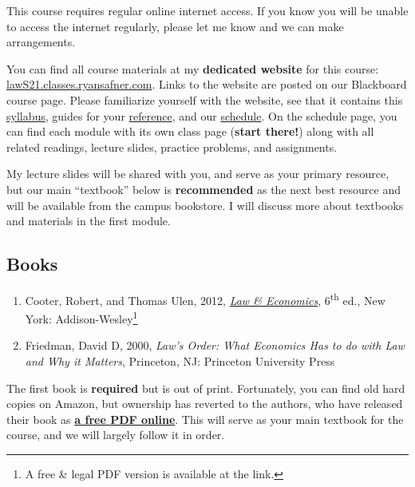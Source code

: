 \documentclass{article}
\begin{document}
This course requires regular online internet access. If you know you
will be unable to access the internet regularly, please let me know and
we can make arrangements.

You can find all course materials at my \textbf{dedicated website} for
this course:
\href{https://lawS21.classes.ryansafner.com}{lawS21.classes.ryansafner.com}.
Links to the website are posted on our Blackboard course page. Please
familiarize yourself with the website, see that it contains this
\href{https://lawS21.classes.ryansafner.com/syllabus/}{syllabus}, guides
for your
\href{https://lawS21.classes.ryansafner.com/reference/}{reference}, and
our \href{https://lawS21.classes.ryansafner.com/schedule/}{schedule}. On
the schedule page, you can find each module with its own class page
(\textbf{start there!}) along with all related readings, lecture slides,
practice problems, and assignments.

My lecture slides will be shared with you, and serve as your primary
resource, but our main ``textbook'' below is \textbf{recommended} as the
next best resource and will be available from the campus bookstore. I
will discuss more about textbooks and materials in the first module.

\hypertarget{books}{%
\subsection*{Books}\label{books}}

\begin{enumerate}
\def\labelenumi{\arabic{enumi}.}
\item
  Cooter, Robert, and Thomas Ulen, 2012,
  \href{https://lawcat.berkeley.edu/record/1127400?ln=en}{\emph{Law \&
  Economics}}, 6\textsuperscript{th} ed., New York:
  Addison-Wesley\footnote{A free \& legal PDF version is available at
    the link.}
\item
  Friedman, David D, 2000, \emph{Law's Order: What Economics Has to do
  with Law and Why it Matters}, Princeton, NJ: Princeton University
  Press
\end{enumerate}

The first book is \textbf{required} but is out of print. Fortunately,
you can find old hard copies on Amazon, but ownership has reverted to
the authors, who have released their book as
\href{https://lawcat.berkeley.edu/record/1127400?ln=en}{\textbf{a free
PDF online}}. This will serve as your main textbook for the course, and
we will largely follow it in order.
\end{document}
